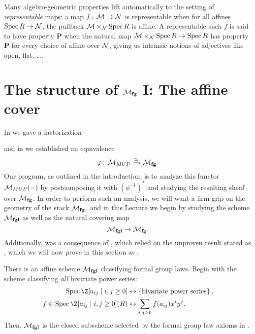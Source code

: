 \begin{remark}
Many algebro-geometric properties lift automatically to the setting of \textit{representable} maps: a map \(f\colon\thinspace \mathcal{M} \to \mathcal{N}\) is representable when for all affines \(\operatorname{Spec} R \to \mathcal{N}\), the pullback \(\mathcal{M} \times_{\mathcal{N}} \operatorname{Spec} R\) is affine.  A representable such \(f\) is said to have property \textbf{P} when the natural map \(\mathcal{M} \times_{\mathcal{N}} \operatorname{Spec} R \to \operatorname{Spec} R\) has property \textbf{P} for every choice of affine over \(\mathcal{N}\), giving us intrinsic notions of adjectives like open, flat, \ldots.
\end{remark}










\section{The structure of \texorpdfstring{\(\mathcal{M}_{\mathbf{fg}}\)}{Mfg} I: The affine cover}\label{MfgI:AffineCover}

In  we gave a factorization
\begin{center}
\end{center}
and in  we established an equivalence \[\varphi\colon\thinspace \mathcal{M}_{MUP} \xrightarrow{\simeq} \mathcal{M}_{\mathbf{fg}}.\]  Our program, as outlined in the introduction, is to analyze this functor \(\mathcal{M}_{MUP}(-)\) by postcomposing it with \((\phi^{-1})^*\) and studying the resulting sheaf over \(\mathcal{M}_{\mathbf{fg}}\).  In order to perform such an analysis, we will want a firm grip on the geometry of the stack \(\mathcal{M}_{\mathbf{fg}}\), and in this Lecture we begin by studying the scheme \(\mathcal{M}_{\mathbf{fgl}}\) as well as the natural covering map \[\mathcal{M}_{\mathbf{fgl}} \to \mathcal{M}_{\mathbf{fg}}.\]  Additionally,  was a consequence of , which relied on the unproven result stated as , which we will now prove in this section as .

\begin{definition}\label{MfglDefn}
There is an affine scheme \(\mathcal{M}_{\mathbf{fgl}}\) classifying formal group laws.  Begin with the scheme classifying \emph{all} bivariate power series:
\begin{align*}
\Spec \Z[a_{ij} \mid i, j \ge 0] & \leftrightarrow \left\{ \text{bivariate power series} \right\}, \\
f \in \Spec\Z[a_{ij} \mid i, j \ge 0](R) & \leftrightarrow \sum_{i, j \ge 0} f(a_{ij}) x^i y^j.
\end{align*}
Then, \(\mathcal{M}_{\mathbf{fgl}}\) is the closed subscheme selected by the formal group law axioms in .
\end{definition}

